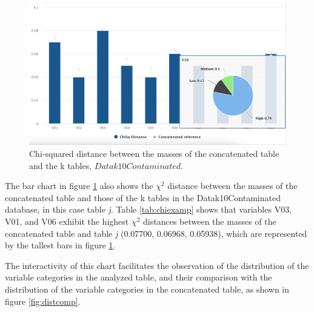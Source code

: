 \documentclass[mathematics,article,submit,moreauthors,pdftex]{mdpi}
\begin{document}
\begin{figure}[H]


\begin{center}\includegraphics[width=0.9\linewidth,]{Chisqr} \end{center}

\caption{Chi-squared distance between the masses of the concatenated table and the k tables, $Datak10Contaminated$.}

\label{fig:chisqr}
\end{figure}

The bar chart in figure \ref{fig:chisqr} also shows the \(\chi^{2}\)
distance between the masses of the concatenated table and those of the k
tables in the Datak10Contaminated database, in this case table \emph{j}.
Table \ref{tab:chiexamp} shows that variables V03, V01, and V06 exhibit
the highest \(\chi^{2}\) distances between the masses of the
concatenated table and table \emph{j} (0.07700, 0.06968, 0.05938), which
are represented by the tallest bars in figure \ref{fig:chisqr}.

The interactivity of this chart facilitates the observation of the
distribution of the variable categories in the analyzed table, and their
comparison with the distribution of the variable categories in the
concatenated table, as shown in figure \ref{fig:distcomp}.
\end{document}
